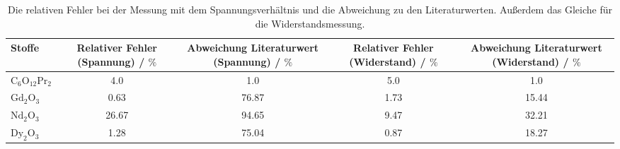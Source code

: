 \begin{table}\caption{Die relativen Fehler bei der Messung mit dem Spannungsverhältnis und die Abweichung zu den Literaturwerten. Außerdem das Gleiche für die Widerstandsmessung.}
\label{taberr}
\centering
{}
\begin{tabular}{l S S S S} 
\toprule
{Stoffe} & {Relativer Fehler (Spannung) / $\si{\percent}$} & {Abweichung Literaturwert (Spannung) / $\si{\percent}$} & {Relativer Fehler (Widerstand) / $\si{\percent}$} & {Abweichung Literaturwert (Widerstand) / $\si{\percent}$} \\
\midrule
$\text{C}_6 \text{O}_{12} \text{Pr}_2$  & 4.0 & 1.0 & 5.0 & 1.0 \\
$\text{Gd}_2 \text{O}_3$                & 0.63 & 76.87 & 1.73 & 15.44 \\
$\text{Nd}_2 \text{O}_3$                & 26.67 & 94.65 & 9.47 & 32.21 \\
$\text{Dy}_2 \text{O}_3$                & 1.28 & 75.04 & 0.87 & 18.27 \\
\bottomrule
\end{tabular}\end{table}
